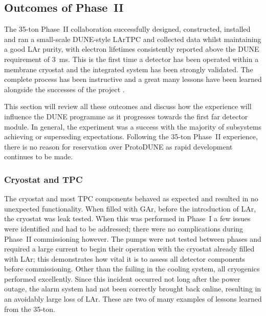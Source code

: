 \subsection{Outcomes of Phase~II}\label{sec:35tonPhaseIIOutcomes}

The 35-ton Phase~II collaboration successfully designed, constructed, installed and ran a small-scale DUNE-style LArTPC and collected data whilst maintaining a good LAr purity, with electron lifetimes consistently reported above the DUNE requirement of 3~ms.  This is the first time a detector has been operated within a membrane cryostat and the integrated system has been strongly validated.  The complete process has been instructive and a great many lessons have been learned alongside the successes of the project \cite{35tonLessonsLearned}.

This section will review all these outcomes and discuss how the experience will influence the DUNE programme as it progresses towards the first far detector module.  In general, the experiment was a success with the majority of subsystems achieving or superseding expectations.  Following the 35-ton Phase~II experience, there is no reason for reservation over ProtoDUNE as rapid development continues to be made.

\subsubsection{Cryostat and TPC}\label{sec:35tonPhaseIIOutcomesCryostatTPC}

The cryostat and most TPC components behaved as expected and resulted in no unexpected functionality.  When filled with GAr, before the introduction of LAr, the cryostat was leak tested.  When this was performed in Phase~I a few issues were identified and had to be addressed; there were no complications during Phase~II commissioning however.  The pumps were not tested between phases and required a large current to begin their operation with the cryostat already filled with LAr; this demonstrates how vital it is to assess all detector components before commissioning.  Other than the failing in the cooling system, all cryogenics performed excellently.  Since this incident occurred not long after the power outage, the alarm system had not been correctly brought back online, resulting in an avoidably large loss of LAr.  These are two of many examples of lessons learned from the 35-ton.

